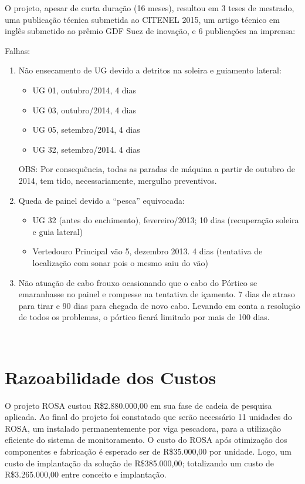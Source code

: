 O projeto, apesar de curta duração (16 meses), resultou em 3 teses de 
mestrado, uma publicação técnica submetida ao CITENEL 2015, um artigo técnico 
em inglês submetido ao prêmio GDF Suez de inovação, e 6 publicações na imprensa: 

Falhas:

\begin{enumerate}
  \item Não ensecamento de UG devido a detritos na soleira e guiamento lateral:
  		\begin{itemize}
  		  \item UG 01, outubro/2014, 4 dias
  		  \item UG 03, outubro/2014, 4 dias
  		  \item UG 05, setembro/2014, 4 dias
  		  \item UG 32, setembro/2014. 4 dias	
  		\end{itemize}
  		OBS: Por consequência, todas as paradas de máquina a partir de
  		outubro de 2014, tem tido, necessariamente, mergulho
  		preventivos. 
  \item Queda de painel devido a “pesca” equivocada:
  		\begin{itemize}
  		  \item UG 32 (antes do enchimento), fevereiro/2013; 10 dias (recuperação
  		  soleira e guia lateral)
  		  \item Vertedouro Principal vão 5, dezembro 2013. 4 dias (tentativa de
  		  localização com sonar pois o mesmo saiu do vão)
  		\end{itemize}
  \item Não atuação de cabo frouxo ocasionando que o cabo do Pórtico se
  emaranhasse no painel e rompesse na tentativa de içamento. 7 dias de atraso 
  para tirar e 90 dias para chegada de novo cabo. Levando em conta a resolução 
  de todos os problemas, o pórtico ficará limitado por mais de 100 dias.
\end{enumerate}
 
     
\section*{Razoabilidade dos Custos}
O projeto ROSA custou R\$2.880.000,00 em sua fase de cadeia de pesquisa
aplicada. Ao final do projeto foi constatado que serão necessário 11 unidades 
do ROSA, um instalado permanentemente por viga pescadora, para a utilização 
eficiente do sistema de monitoramento. O custo do ROSA após otimização dos 
componentes e fabricação é esperado ser de R\$35.000,00 por unidade. Logo, um
custo de implantação da solução de R\$385.000,00; totalizando um custo de
R\$3.265.000,00 entre conceito e implantação.

